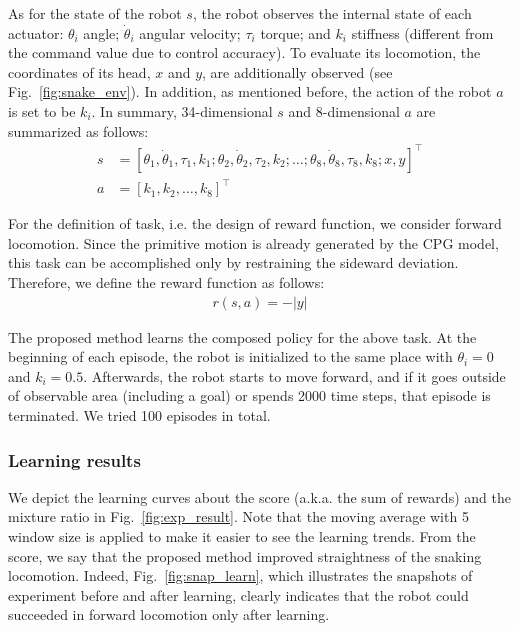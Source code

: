 \documentclass{bmcart}
\begin{document}
As for the state of the robot $s$, the robot observes the internal state of each actuator: $\theta_i$ angle; $\dot{\theta}_i$ angular velocity; $\tau_i$ torque; and $k_i$ stiffness (different from the command value due to control accuracy).
To evaluate its locomotion, the coordinates of its head, $x$ and $y$, are additionally observed (see Fig.~\ref{fig:snake_env}).
In addition, as mentioned before, the action of the robot $a$ is set to be $k_i$.
In summary, 34-dimensional $s$ and 8-dimensional $a$ are summarized as follows:
\begin{align}
    s &= [\theta_1, \dot{\theta}_1, \tau_1, k_1; \theta_2, \dot{\theta}_2, \tau_2, k_2; \ldots; \theta_8, \dot{\theta}_8, \tau_8, k_8; x, y]^\top
    \label{eq:robot_state} \\
    a &= [k_1, k_2, \ldots, k_8]^\top
    \label{eq:robot_action}
\end{align}

For the definition of task, i.e. the design of reward function, we consider forward locomotion.
Since the primitive motion is already generated by the CPG model, this task can be accomplished only by restraining the sideward deviation.
Therefore, we define the reward function as follows:
\begin{align}
    r(s, a) = - |y|
    \label{eq:robot_reward}
\end{align}

The proposed method learns the composed policy for the above task.
At the beginning of each episode, the robot is initialized to the same place with $\theta_i = 0$ and $k_i = 0.5$.
Afterwards, the robot starts to move forward, and if it goes outside of observable area (including a goal) or spends 2000 time steps, that episode is terminated.
We tried 100 episodes in total.

\subsubsection{Learning results}

We depict the learning curves about the score (a.k.a. the sum of rewards) and the mixture ratio in Fig.~\ref{fig:exp_result}.
Note that the moving average with 5 window size is applied to make it easier to see the learning trends.
From the score, we say that the proposed method improved straightness of the snaking locomotion.
Indeed, Fig.~\ref{fig:snap_learn}, which illustrates the snapshots of experiment before and after learning, clearly indicates that the robot could succeeded in forward locomotion only after learning.
\end{document}
